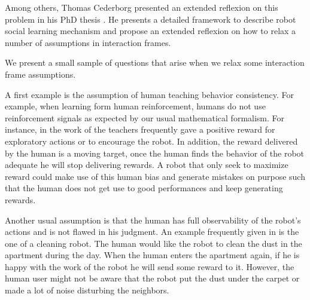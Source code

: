 Among others, Thomas Cederborg presented an extended reflexion on this problem in his PhD thesis \cite{cederborg2014thesis}. He presents a detailed framework to describe robot social learning mechanism \cite{cederborg2013language} and propose an extended reflexion on how to relax a number of assumptions in interaction frames. 

We present a small sample of questions that arise when we relax some interaction frame assumptions.

A first example is the assumption of human teaching behavior consistency. For example, when learning form human reinforcement, humans do not use reinforcement signals as expected by our usual mathematical formalism. For instance, in the work of \cite{thomaz2008teachable} the teachers frequently gave a positive reward for exploratory actions or to encourage the robot. In addition, the reward delivered by the human is a moving target, once the human finds the behavior of the robot adequate he will stop delivering rewards. A robot that only seek to maximize reward could make use of this human bias and generate mistakes on purpose such that the human does not get use to good performances and keep generating rewards.

Another usual assumption is that the human has full observability of the robot's actions and is not flawed in his judgment. An example frequently given in \cite{cederborg2014thesis} is the one of a cleaning robot. The human would like the robot to clean the dust in the apartment during the day. When the human enters the apartment again, if he is happy with the work of the robot he will send some reward to it. However, the human user might not be aware that the robot put the dust under the carpet or made a lot of noise disturbing the neighbors.



